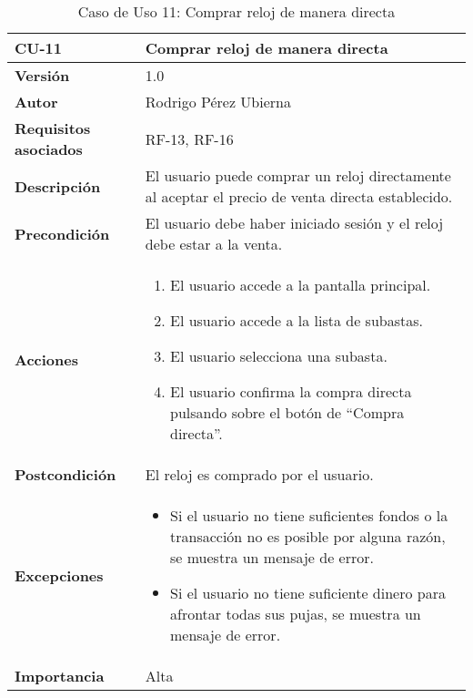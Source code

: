 \begin{table}[p]
	\centering
	\begin{tabularx}{\linewidth}{ p{} p{} }
		\toprule
		\textbf{CU-11} & \textbf{Comprar reloj de manera directa}\\
		\toprule
		\textbf{Versión} & 1.0 \\
		\textbf{Autor} & Rodrigo Pérez Ubierna \\
		\textbf{Requisitos asociados} & RF-13, RF-16 \\
		\textbf{Descripción} & El usuario puede comprar un reloj directamente al aceptar el precio de venta directa establecido. \\
		\textbf{Precondición} & El usuario debe haber iniciado sesión y el reloj debe estar a la venta. \\
		\textbf{Acciones} &
		\begin{enumerate}
			\def\labelenumi{\arabic{enumi}.}
			\tightlist
			\item El usuario accede a la pantalla principal.
			\item El usuario accede a la lista de subastas.
			\item El usuario selecciona una subasta.
			\item El usuario confirma la compra directa pulsando sobre el botón de ``Compra directa''.
		\end{enumerate}\\
		\textbf{Postcondición} & El reloj es comprado por el usuario. \\
		\textbf{Excepciones} &
			\begin{itemize}
				\item Si el usuario no tiene suficientes fondos o la transacción no es posible por alguna razón, se muestra un mensaje de error.
				\item Si el usuario no tiene suficiente dinero para afrontar todas sus pujas, se muestra un mensaje de error.
			\end{itemize} \\
		\textbf{Importancia} & Alta \\
		\bottomrule
	\end{tabularx}
	\caption{Caso de Uso 11: Comprar reloj de manera directa}
\end{table}

